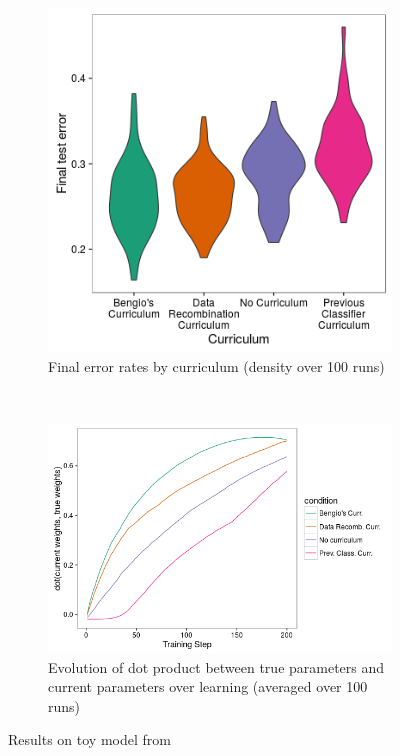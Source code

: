 \documentclass[11pt]{article}
\begin{document}
\begin{figure}
\centering
\begin{subfigure}{0.38\textwidth}
\includegraphics[width=\textwidth]{toy_results/violin_plot.png}
\caption{Final error rates by curriculum (density over 100 runs)}
\label{toy_errors}
\end{subfigure}
~
\begin{subfigure}{0.57\textwidth}
\includegraphics[width=\textwidth]{toy_results/dot_trace_plot.png}
\caption{Evolution of dot product between true parameters and current parameters over learning (averaged over 100 runs)}
\label{toy_dots}
\end{subfigure}
\caption{Results on toy model from \cite{Bengio2009}}
\label{preliminary_results}
\end{figure}
\end{document}
